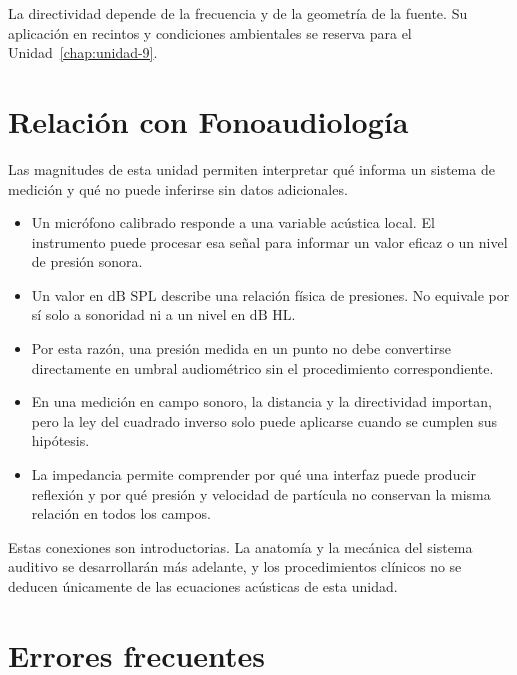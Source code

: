 La directividad depende de la frecuencia y de la geometría de la fuente. Su
aplicación en recintos y condiciones ambientales se reserva para el
Unidad~\ref{chap:unidad-9}.

\section{Relación con Fonoaudiología}
\label{sec:u4-fonoaudiologia}

Las magnitudes de esta unidad permiten interpretar qué informa un sistema de
medición y qué no puede inferirse sin datos adicionales.

\begin{itemize}
    \item Un micrófono calibrado responde a una variable acústica local. El
    instrumento puede procesar esa señal para informar un valor eficaz o un
    nivel de presión sonora.

    \item Un valor en \(\text{dB SPL}\) describe una relación física de
    presiones. No equivale por sí solo a sonoridad ni a un nivel en
    \(\text{dB HL}\).

    \item {} Por esta razón, una presión medida en un punto no debe
    convertirse directamente en umbral audiométrico sin el procedimiento
    correspondiente.

    \item En una medición en campo sonoro, la distancia y la directividad
    importan, pero la ley del cuadrado inverso solo puede aplicarse cuando se
    cumplen sus hipótesis.

    \item La impedancia permite comprender por qué una interfaz puede producir
    reflexión y por qué presión y velocidad de partícula no conservan la misma
    relación en todos los campos.
\end{itemize}

Estas conexiones son introductorias. La anatomía y la mecánica del sistema
auditivo se desarrollarán más adelante, y los procedimientos clínicos no se
deducen únicamente de las ecuaciones acústicas de esta unidad.

\section{Errores frecuentes}
\label{sec:u4-errores}


